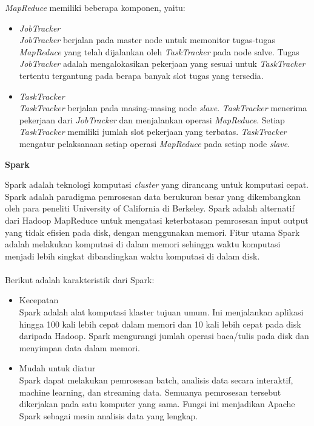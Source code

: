 \documentclass[a4paper,twoside]{article}
\begin{document}
\begin{enumerate}
\begin{itemize}
\end{itemize}

\noindent \textit{MapReduce} memiliki beberapa komponen, yaitu:

\begin{itemize}
\item \textit{JobTracker}\\
\textit{JobTracker} berjalan pada master node untuk memonitor tugas-tugas \textit{MapReduce} yang telah dijalankan oleh \textit{TaskTracker} pada node salve. Tugas \textit{JobTracker} adalah mengalokasikan pekerjaan yang sesuai untuk \textit{TaskTracker} tertentu tergantung pada berapa banyak slot tugas yang tersedia. 
\item \textit{TaskTracker}\\
\textit{TaskTracker} berjalan pada masing-masing node \textit{slave}. \textit{TaskTracker} menerima pekerjaan dari \textit{JobTracker} dan menjalankan operasi \textit{MapReduce}. Setiap \textit{TaskTracker} memiliki jumlah slot pekerjaan yang terbatas. \textit{TaskTracker} mengatur pelaksanaan setiap operasi \textit{MapReduce} pada setiap node \textit{slave}. 
\end{itemize}
		
\textbf{Spark}

Spark adalah teknologi komputasi \textit{cluster} yang dirancang untuk komputasi cepat. Spark adalah paradigma pemrosesan data berukuran besar yang dikembangkan oleh para peneliti University of California di Berkeley. Spark adalah alternatif dari Hadoop MapReduce untuk mengatasi keterbatasan pemrosesan input output yang tidak efisien pada disk, dengan menggunakan memori. Fitur utama Spark adalah melakukan komputasi di dalam memori sehingga waktu komputasi menjadi lebih singkat dibandingkan waktu komputasi di dalam disk.
\\\\
Berikut adalah karakteristik dari Spark:
\begin{itemize}
\item Kecepatan\\
Spark adalah alat komputasi klaster tujuan umum. Ini menjalankan aplikasi hingga 100 kali lebih cepat dalam memori dan 10 kali lebih cepat pada disk daripada Hadoop. Spark mengurangi jumlah operasi baca/tulis pada disk dan menyimpan data dalam memori.


\item Mudah untuk diatur\\	
Spark dapat melakukan pemrosesan batch, analisis data secara interaktif, machine learning, dan streaming data. Semuanya pemrosesan tersebut dikerjakan pada satu komputer yang sama. Fungsi ini menjadikan Apache Spark sebagai mesin analisis data yang lengkap. 



\end{itemize}
\end{enumerate}
\end{document}
